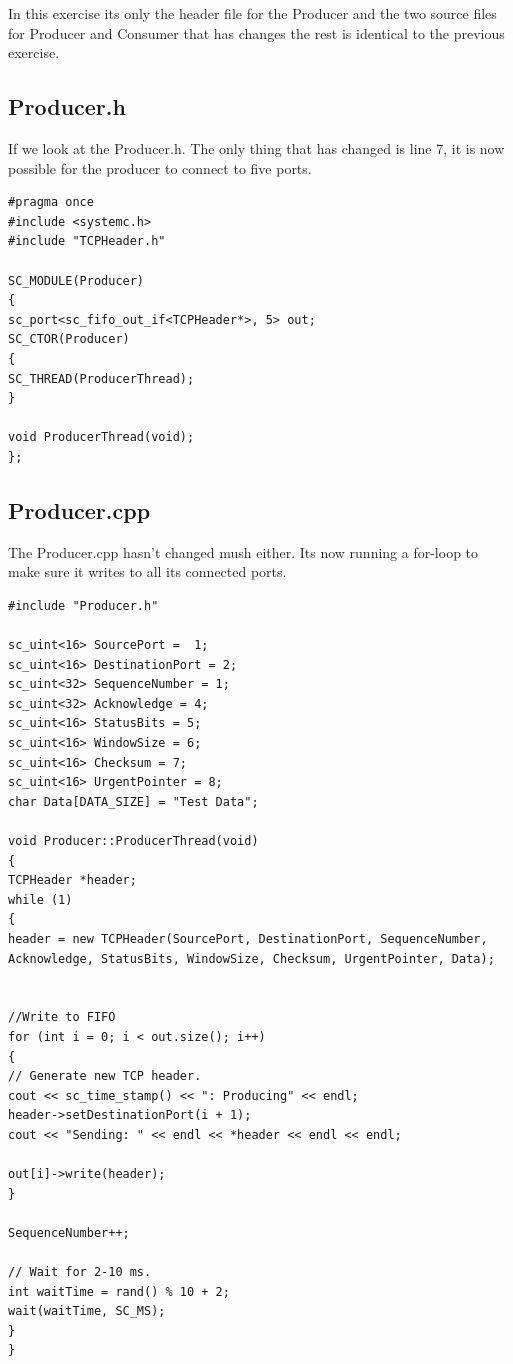In this exercise its only the header file for the Producer and the two source files for Producer and Consumer that has changes the rest is identical to the previous exercise. 

\subsection{Producer.h}
If we look at the Producer.h. The only thing that has changed is line 7, it is now possible for the producer to connect to five ports.

\begin{lstlisting}
#pragma once
#include <systemc.h>
#include "TCPHeader.h"

SC_MODULE(Producer)
{
sc_port<sc_fifo_out_if<TCPHeader*>, 5> out;
SC_CTOR(Producer)
{
SC_THREAD(ProducerThread);
}

void ProducerThread(void);
};
\end{lstlisting}



\subsection{Producer.cpp}
The Producer.cpp hasn't changed mush either. Its now running a for-loop to make sure it writes to all its connected ports. 
\begin{lstlisting}
#include "Producer.h"

sc_uint<16> SourcePort =  1;
sc_uint<16> DestinationPort = 2;
sc_uint<32> SequenceNumber = 1;
sc_uint<32> Acknowledge = 4;
sc_uint<16> StatusBits = 5;
sc_uint<16> WindowSize = 6;
sc_uint<16> Checksum = 7;
sc_uint<16> UrgentPointer = 8;
char Data[DATA_SIZE] = "Test Data";

void Producer::ProducerThread(void)
{
TCPHeader *header;
while (1)
{
header = new TCPHeader(SourcePort, DestinationPort, SequenceNumber, Acknowledge, StatusBits, WindowSize, Checksum, UrgentPointer, Data);


//Write to FIFO
for (int i = 0; i < out.size(); i++)
{
// Generate new TCP header.
cout << sc_time_stamp() << ": Producing" << endl;
header->setDestinationPort(i + 1);
cout << "Sending: " << endl << *header << endl << endl;

out[i]->write(header);
}

SequenceNumber++;

// Wait for 2-10 ms.
int waitTime = rand() % 10 + 2;
wait(waitTime, SC_MS);
}
}
\end{lstlisting}



